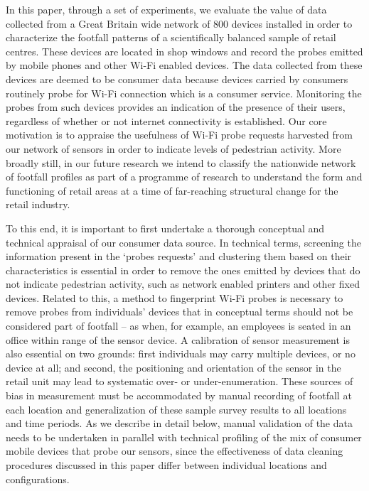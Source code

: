 In this paper, through a set of experiments, we evaluate the value of data
collected from a Great Britain wide network of 800 devices \citep{sss2016}
installed in order to characterize the footfall patterns of a scientifically
balanced sample of retail centres.  These devices are located in shop windows
and record the probes emitted by mobile phones and other Wi-Fi enabled devices.
The data collected from these devices are deemed to be consumer data because
devices carried by consumers routinely probe for Wi-Fi connection which is a
consumer service.  Monitoring the probes from such devices provides an
indication of the presence of their users, regardless of whether or not
internet connectivity is established.  Our core motivation is to appraise the
usefulness of Wi-Fi probe requests harvested from our network of sensors in
order to indicate levels of pedestrian activity.  More broadly still, in our
future research we intend to classify the nationwide network of footfall
profiles as part of a programme of research to understand the form and
functioning of retail areas at a time of far-reaching structural change for the
retail industry.

To this end, it is important to first undertake a thorough conceptual and
technical appraisal of our consumer data source.  In technical terms, screening
the information present in the `probes requests' and clustering them based on
their characteristics is essential in order to remove the ones emitted by
devices that do not indicate pedestrian activity, such as network enabled
printers and other fixed devices.  Related to this, a method to fingerprint
Wi-Fi probes is necessary to remove probes from individuals’ devices that in
conceptual terms should not be considered part of footfall – as when, for
example, an employees is seated in an office within range of the sensor device.
A calibration of sensor measurement is also essential on two grounds: first
individuals may carry multiple devices, or no device at all; and second, the
positioning and orientation of the sensor in the retail unit may lead to
systematic over- or under-enumeration.  These sources of bias in measurement
must be accommodated by manual recording of footfall at each location and
generalization of these sample survey results to all locations and time
periods.  As we describe in detail below, manual validation of the data needs
to be undertaken in parallel with technical profiling of the mix of consumer
mobile devices that probe our sensors, since the effectiveness of data cleaning
procedures discussed in this paper differ between individual locations and
configurations.
